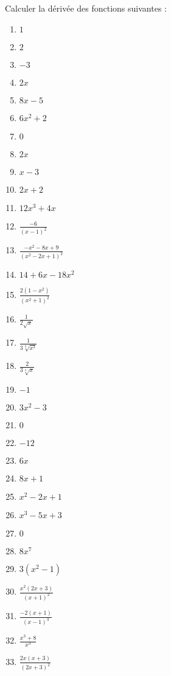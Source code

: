 \begin{solution}
 Calculer la dérivée des fonctions suivantes :
 \begin{multicols}{2}
\begin{enumerate}
\item $1$
\item $2$
\item $-3$
\item $2x$
\item $8x-5$
\item $6{{x}^{2}}+2$
\item $0$
\item $2x$
\item $x-3$
\item $2x+2$
\item $12{{x}^{3}}+4x$
\item $\frac{-6}{{{\left( x-1 \right)}^{2}}}$
\item $\frac{-{{x}^{2}}-8x+9}{{{\left( {{x}^{2}}-2x+1 \right)}^{2}}}$
\item $14+6x-18{{x}^{2}}$
\item $\frac{2\left( 1-{{x}^{2}} \right)}{{{\left( {{x}^{2}}+1 \right)}^{2}}}$
\item $\frac{1}{2\sqrt{x}}$
\item $\frac{1}{3\sqrt[3]{{{x}^{2}}}}$
\item $\frac{2}{3\sqrt[3]{x}}$
\item $-1$
\item $3{{x}^{2}}-3$
\item $0$
\item $-12$
\item $6x$
\item $8x+1$
\item ${{x}^{2}}-2x+1$
\item ${{x}^{3}}-5x+3$
\item $0$
\item $8{{x}^{7}}$
\item $3\left( {{x}^{2}}-1 \right)$
\item $\frac{{{x}^{2}}\left( 2x+3 \right)}{{{\left( x+1 \right)}^{2}}}$
\item $\frac{-2\left( x+1 \right)}{{{\left( x-1 \right)}^{3}}}$
\item $\frac{{{x}^{3}}+8}{{{x}^{3}}}$
\item $\frac{2x\left( x+3 \right)}{{{\left( 2x+3 \right)}^{2}}}$
\end{enumerate}
\end{multicols}
\end{solution}

